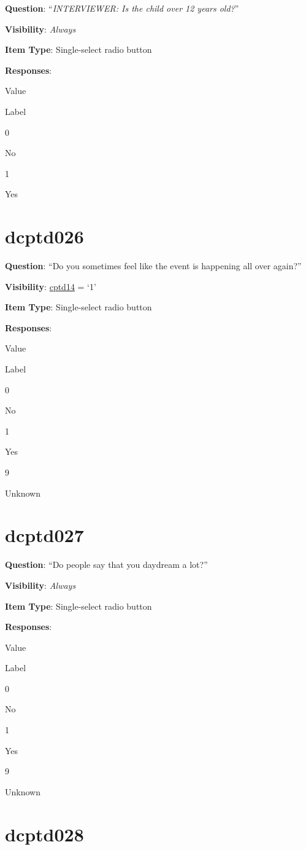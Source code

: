 \documentclass[]{book}
\begin{document}
\textbf{Question}: ``\emph{INTERVIEWER: Is the child over 12 years old?}''

\textbf{Visibility}: \emph{Always}

\textbf{Item Type}: Single-select radio button

\textbf{Responses}:

Value

Label

0

No

1

Yes

\hypertarget{dcptd026}{%
\section{dcptd026}\label{dcptd026}}

\textbf{Question}: ``Do you sometimes feel like the event is happening all over again?''

\textbf{Visibility}: \protect\hyperlink{cptd14}{cptd14} = `1'

\textbf{Item Type}: Single-select radio button

\textbf{Responses}:

Value

Label

0

No

1

Yes

9

Unknown

\hypertarget{dcptd027}{%
\section{dcptd027}\label{dcptd027}}

\textbf{Question}: ``Do people say that you daydream a lot?''

\textbf{Visibility}: \emph{Always}

\textbf{Item Type}: Single-select radio button

\textbf{Responses}:

Value

Label

0

No

1

Yes

9

Unknown

\hypertarget{dcptd028}{%
\section{dcptd028}\label{dcptd028}}
\end{document}
